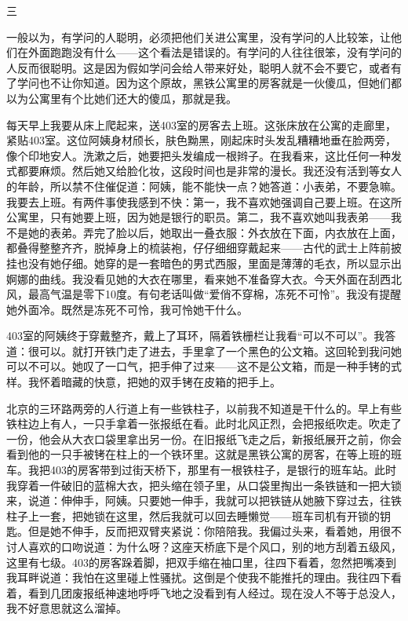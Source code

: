 三 

一般以为，有学问的人聪明，必须把他们关进公寓里，没有学问的人比较笨，让他们在外面跑跑没有什么——这个看法是错误的。有学问的人往往很笨，没有学问的人反而很聪明。这是因为假如学问会给人带来好处，聪明人就不会不要它，或者有了学问也不让你知道。因为这个原故，黑铁公寓里的房客就是一伙傻瓜，但她们都以为公寓里有个比她们还大的傻瓜，那就是我。 



每天早上我要从床上爬起来，送403室的房客去上班。这张床放在公寓的走廊里，紧贴403室。这位阿姨身材颀长，肤色黝黑，刚起床时头发乱糟糟地垂在脸两旁，像个印地安人。洗漱之后，她要把头发编成一根辫子。在我看来，这比任何一种发式都要麻烦。然后她又给脸化妆，这段时间也是非常的漫长。我还没有活到等女人的年龄，所以禁不住催促道：阿姨，能不能快一点？她答道：小表弟，不要急嘛。我要去上班。有两件事使我感到不快：第一，我不喜欢她强调自己要上班。在这所公寓里，只有她要上班，因为她是银行的职员。第二，我不喜欢她叫我表弟——我不是她的表弟。弄完了脸以后，她取出一叠衣服：外衣放在下面，内衣放在上面，都叠得整整齐齐，脱掉身上的梳装袍，仔仔细细穿戴起来——古代的武士上阵前披挂也没有她仔细。她穿的是一套暗色的男式西服，里面是薄薄的毛衣，所以显示出婀娜的曲线。我没看见她的大衣在哪里，看来她不准备穿大衣。今天外面在刮西北风，最高气温是零下10度。有句老话叫做“爱俏不穿棉，冻死不可怜”。我没有提醒她外面冷。既然是冻死不可怜，我可怜她干什么。 

403室的阿姨终于穿戴整齐，戴上了耳环，隔着铁栅栏让我看“可以不可以”。我答道：很可以。就打开铁门走了进去，手里拿了一个黑色的公文箱。这回轮到我问她可以不可以。她叹了一口气，把手伸了过来——这不是公文箱，而是一种手铐的式样。我怀着暗藏的快意，把她的双手铐在皮箱的把手上。 

北京的三环路两旁的人行道上有一些铁柱子，以前我不知道是干什么的。早上有些铁柱边上有人，一只手拿着一张报纸在看。此时北风正烈，会把报纸吹走。吹走了一份，他会从大衣口袋里拿出另一份。在旧报纸飞走之后，新报纸展开之前，你会看到他的一只手被铐在柱上的一个铁环里。这就是黑铁公寓的房客，在等上班的班车。我把403的房客带到过街天桥下，那里有一根铁柱子，是银行的班车站。此时我穿着一件破旧的蓝棉大衣，把头缩在领子里，从口袋里掏出一条铁链和一把大锁来，说道：伸伸手，阿姨。只要她一伸手，我就可以把铁链从她腋下穿过去，往铁柱子上一套，把她锁在这里，然后我就可以回去睡懒觉——班车司机有开锁的钥匙。但是她不伸手，反而把双臂夹紧说：你陪陪我。我偏过头来，看着她，用很不讨人喜欢的口吻说道：为什么呀？这座天桥底下是个风口，别的地方刮着五级风，这里有七级。403的房客跺着脚，把双手缩在袖口里，往四下看着，忽然把嘴凑到我耳畔说道：我怕在这里碰上性骚扰。这倒是个使我不能推托的理由。我往四下看着，看到几团废报纸神速地呼呼飞地之没看到有人经过。现在没人不等于总没人，我不好意思就这么溜掉。 




